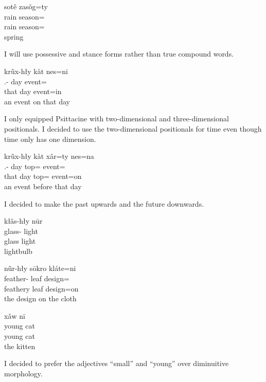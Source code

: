 \documentclass[12pt]{article}
\begin{document}
    \begin{exe}
        \ex
        \glll
        sotê zasõg=ty \\
        rain season=\Poss{} \\
        rain season=\Poss{} \\
        \glt
        spring
    \end{exe}
    I will use possessive and stance forms
    rather than true compound words.

    \begin{exe}
        \ex
        \glll
        krũx-hły kàt nes=ni \\
        \Dem{}.\Dist{}-\Adj{} day event=\InessTwo{} \\
        that day event=in \\
        \glt
        an event on that day
    \end{exe}
    I only equipped Psittacine with
    two-dimensional and three-dimensional positionals.
    I decided to use the two-dimensional positionals
    for time even though time only has one dimension.

    \begin{exe}
        \ex
        \glll
        krũx-hły kàt xâr=ty nes=na \\
        \Dem{}.\Dist{}-\Adj{} day top=\Poss{} event=\AdessTwo{} \\
        that day top=\Poss{} event=on \\
        \glt
        an event before that day
    \end{exe}
    I decided to make the past upwards and the future downwards.

    \begin{exe}
        \ex
        \glll
        kłǎs-hły nūr \\
        glass-\Adj{} light \\
        glass light \\
        \glt
        lightbulb
    \end{exe}

    \begin{exe}
        \ex
        \glll
        nũr-hły sōkro kláte=ni \\
        feather-\Adj{} leaf design=\InessTwo{} \\
        feathery leaf design=on \\
        \glt
        the design on the cloth
    \end{exe}

    \begin{exe}
        \ex
        \glll
        xǎw nī \\
        young cat \\
        young cat \\
        \glt
        the kitten
    \end{exe}
    I decided to prefer the adjectives ``small'' and ``young'' over diminuitive morphology.
\end{document}

